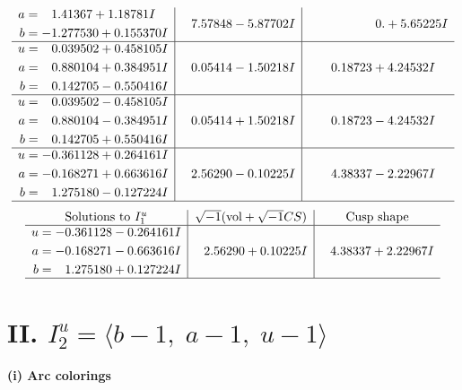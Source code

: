 \documentclass[1p]{elsarticle_modified}
\theoremstyle{definition}
\newcommand{\I}{\sqrt{-1}}
\begin{document}
$$\begin{array}{c|c|c}
\begin{aligned}
a &= \phantom{-}1.41367 + 1.18781 I \\
b &= -1.277530 + 0.155370 I\end{aligned}
 & \phantom{-}7.57848 - 5.87702 I & \phantom{-0.000000 -}0. + 5.65225 I \\ \hline\begin{aligned}
u &= \phantom{-}0.039502 + 0.458105 I \\
a &= \phantom{-}0.880104 + 0.384951 I \\
b &= \phantom{-}0.142705 - 0.550416 I\end{aligned}
 & \phantom{-}0.05414 - 1.50218 I & \phantom{-}0.18723 + 4.24532 I \\ \hline\begin{aligned}
u &= \phantom{-}0.039502 - 0.458105 I \\
a &= \phantom{-}0.880104 - 0.384951 I \\
b &= \phantom{-}0.142705 + 0.550416 I\end{aligned}
 & \phantom{-}0.05414 + 1.50218 I & \phantom{-}0.18723 - 4.24532 I \\ \hline\begin{aligned}
u &= -0.361128 + 0.264161 I \\
a &= -0.168271 + 0.663616 I \\
b &= \phantom{-}1.275180 - 0.127224 I\end{aligned}
 & \phantom{-}2.56290 - 0.10225 I & \phantom{-}4.38337 - 2.22967 I\\
 \hline 
 \end{array}$$\newpage$$\begin{array}{c|c|c}  
\text{Solutions to }I^u_{1}& \I (\text{vol} + \sqrt{-1}CS) & \text{Cusp shape}\\
 \hline 
\begin{aligned}
u &= -0.361128 - 0.264161 I \\
a &= -0.168271 - 0.663616 I \\
b &= \phantom{-}1.275180 + 0.127224 I\end{aligned}
 & \phantom{-}2.56290 + 0.10225 I & \phantom{-}4.38337 + 2.22967 I\\
 \hline 
 \end{array}$$\newpage\newpage\renewcommand{\arraystretch}{1}
\centering \section*{II. $I^u_{2}= \langle b-1,\;a-1,\;u-1 \rangle$}
\flushleft \textbf{(i) Arc colorings}\\
\end{document}

